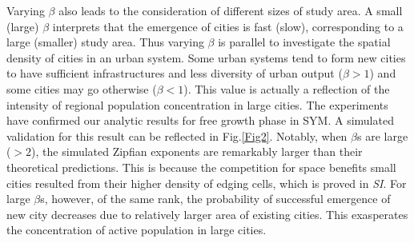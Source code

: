 \documentclass[reprint,unsortedaddress,amsmath,amssymb,aps,prl,showkeys]{revtex4-2}
\begin{document}
Varying $\beta$ also leads to the consideration of different sizes of study area. A small (large) $\beta$ interprets that the emergence of cities is fast (slow), corresponding to a large (smaller) study area. %
Thus varying $\beta$ is parallel to investigate the spatial density of cities in an urban system. Some urban systems tend to form new cities to have sufficient infrastructures and less diversity of urban output\cite{batty2008size} ($\beta > 1$) and some cities may go otherwise ($\beta< 1$). This value is actually a reflection of the intensity of regional population concentration in large cities. The experiments have confirmed our analytic results for free growth phase in SYM. %
A simulated validation for this result can be reflected in Fig.\ref{Fig2}. Notably, when $\beta$s are large ($>2$), the simulated Zipfian exponents are remarkably larger than their theoretical predictions. This is because the competition for space benefits small %
cities resulted from their higher density of edging cells, which is proved in \textit{SI}. For large $\beta$s, however, of the same rank, the probability of successful emergence of new city decreases due to relatively larger area of existing cities. This exasperates the concentration of active population in large cities.%
\end{document}
